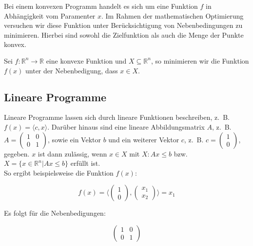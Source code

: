 \begin{theorem}
\begin{Def}
\begin{Def}
Bei einem konvexen Programm handelt es sich um eine Funktion $f$ in Abhängigkeit vom Paramenter $x$. Im Rahmen der mathematischen Optimierung versuchen wir diese Funktion unter Berücksichtigung von Nebenbedingungen zu minimieren. Hierbei sind sowohl die Zielfunktion als auch die Menge der Punkte konvex.

\begin{Def}
Sei $f: \mathbb{R}^{n} \rightarrow \mathbb{R}$ eine konvexe Funktion und $X \subseteq \mathbb{R}^{n}$, so minimieren wir die Funktion $f(x)$ unter der Nebenbedigung, dass $x \in X$.
\end{Def}


\subsection{Lineare Programme}

Lineare Programme lassen sich durch lineare Funktionen beschreiben, z.~B. $f(x) = \langle c, x \rangle$. Darüber hinaus sind eine lineare Abbildungsmatrix $A$, z.~B. $A = \begin{pmatrix}1 & 0 \\ 0 & 1 \end{pmatrix}$, sowie ein Vektor $b$ und ein weiterer Vektor $c$, z.~B. $c = \begin{pmatrix}1 \\ 0 \end{pmatrix}$, gegeben. $x$ ist dann zulässig, wenn $x \in X$ mit $X: Ax \le b$ bzw. $X = \{x \in \mathbb{R}^{n} | Ax \le b\}$ erfüllt ist. \\
So ergibt beispielsweise die Funktion $f(x)$:

\begin{equation*}
f(x) = \langle \begin{pmatrix}1 \\ 0 \end{pmatrix}, \begin{pmatrix}x_{1} \\ x_{2} \end{pmatrix} \rangle = x_{1}
\end{equation*}

Es folgt für die Nebenbedigungen:

\begin{equation*}
\begin{pmatrix}1 & 0 \\ 0 & 1 \end{pmatrix}
\end{equation*}


\end{Def}
\end{Def}
\end{theorem}
